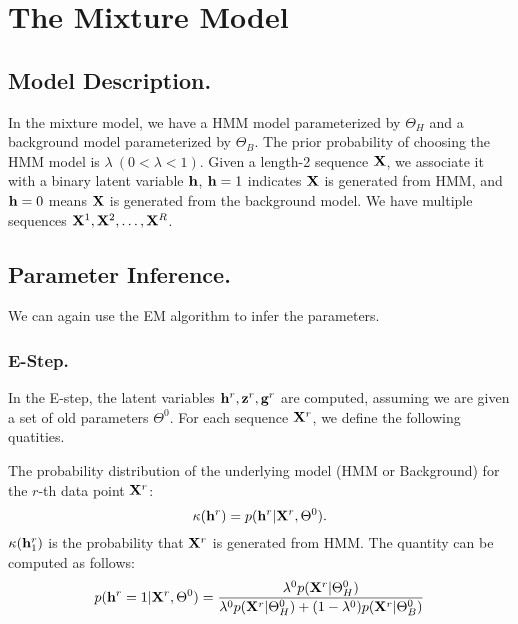 
\section{The Mixture Model}


\subsection{Model Description.}

In the mixture model, we have a HMM model parameterized by $\Theta_H$ and a
background model parameterized by $\Theta_B$. The prior probability of choosing
the HMM model is $\lambda ~(0 < \lambda < 1)$. Given a length-2 sequence $\mathbf{X}$,
we associate it with a binary latent variable $\mathbf{h}$, $\mathbf{h}=1$ indicates $\mathbf{X}$ is
generated from HMM, and $\mathbf{h}=0$ means $\mathbf{X}$ is generated from the background
model.  We have multiple sequences $\mathbf{X}^1, \mathbf{X}^2, \ldots, \mathbf{X}^R$.


\subsection{Parameter Inference.}
We can again use the EM algorithm to infer the parameters.

\subsubsection{E-Step.}

In the E-step, the latent variables $\mathbf{h}^r, \mathbf{z}^r, \mathbf{g}^r$ are computed, assuming
we are given a set of old parameters $\Theta^0$. For each sequence $\mathbf{X}^r$, we define the following
quatities.

The probability distribution of the underlying model (HMM or Background) for the $r$-th data point $\mathbf{X}^r$:
$$
\kappa(\mathbf{h}^r) = p(\mathbf{h}^r | \mathbf{X}^r, \Theta^0).
$$
$\kappa(\mathbf{h}_{1}^r)$ is the probability that $\mathbf{X}^r$ is generated from HMM.
The quantity can be computed as follows:
$$
p(\mathbf{h}^r=1 | \mathbf{X}^r, \Theta^0) = \frac{\lambda^0 p(\mathbf{X}^r | \Theta_H^0)}
{\lambda^0 p(\mathbf{X}^r | \Theta_{H}^0) +  (1- \lambda^0) p(\mathbf{X}^r | \Theta_B^0)}
$$


